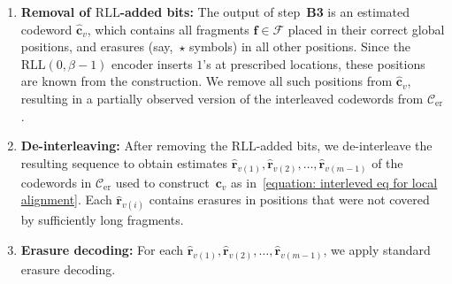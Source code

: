 \documentclass[journal,letterpaper,onecolumn,11pt]{IEEEtran}
\newcommand{\cC}{\mathcal{C}}
\newcommand{\cF}{\mathcal{F}}
\newcommand{\boldc}{\mathbf{c}}
\newcommand{\boldf}{\mathbf{f}}
\newcommand{\boldr}{\mathbf{r}}
\begin{document}
\begin{enumerate}
    \item[\textbf{C1}] \textbf{Removal of $\mathrm{RLL}$-added bits:} 
    The output of step~\textbf{B3} is an estimated codeword $\hat{\boldc}_v$, which contains all fragments $\boldf\in \cF$ placed in their correct global positions, and erasures (say,~$\star$ symbols) in all other positions. 
    Since the $\mathrm{RLL}(0,\beta-1)$ encoder inserts $1$'s at prescribed locations, these positions are known from the construction. 
    We remove all such positions from $\hat{\boldc}_v$, resulting in a partially observed version of the interleaved codewords from $\cC_{\mathrm{er}}$.

    \item[\textbf{C2}] \textbf{De-interleaving:} 
    After removing the $\mathrm{RLL}$-added bits, we de-interleave the resulting sequence  to obtain estimates $\hat{\boldr}_{v(1)},\hat{\boldr}_{v(2)},\dots,\hat{\boldr}_{v(m-1)}$ of the codewords in $\cC_{\mathrm{er}}$ used to construct~$\boldc_v$ as in~\eqref{equation: interleved eq for local alignment}. 
    Each $\hat{\boldr}_{v(i)}$ contains erasures in positions that were not covered by sufficiently long fragments.

    \item[\textbf{C3}] \textbf{Erasure decoding:} 
    For each $\hat{\boldr}_{v(1)},\hat{\boldr}_{v(2)},\dots,\hat{\boldr}_{v(m-1)}$, we apply standard erasure decoding.         
\end{enumerate}
\end{document}
